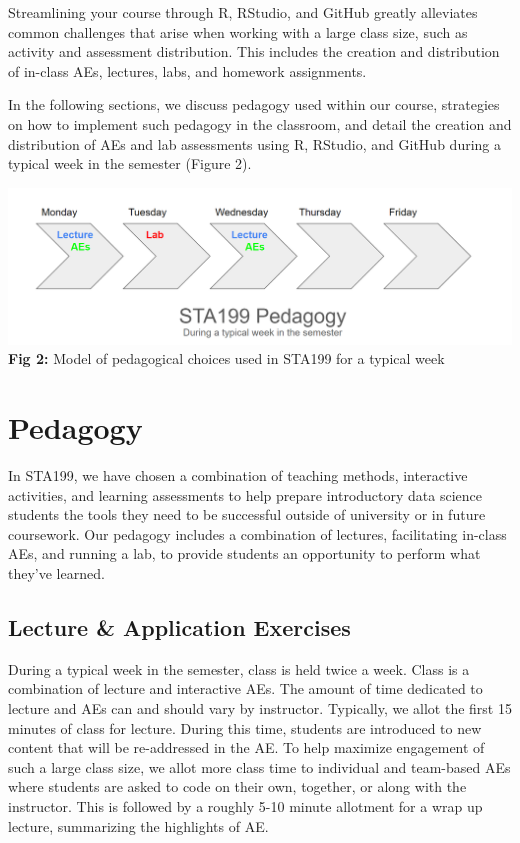 \documentclass[
  12pt]{article}
\begin{document}
Streamlining your course through R, RStudio, and GitHub greatly
alleviates common challenges that arise when working with a large class
size, such as activity and assessment distribution. This includes the
creation and distribution of in-class AEs, lectures, labs, and homework
assignments.

In the following sections, we discuss pedagogy used within our course,
strategies on how to implement such pedagogy in the classroom, and
detail the creation and distribution of AEs and lab assessments using R,
RStudio, and GitHub during a typical week in the semester (Figure 2).

\includegraphics{images/pedagogy.png} \textbf{Fig 2:} Model of
pedagogical choices used in STA199 for a typical week

\hypertarget{sec-ped}{%
\section{Pedagogy}\label{sec-ped}}

In STA199, we have chosen a combination of teaching methods, interactive
activities, and learning assessments to help prepare introductory data
science students the tools they need to be successful outside of
university or in future coursework. Our pedagogy includes a combination
of lectures, facilitating in-class AEs, and running a lab, to provide
students an opportunity to perform what they've learned.

\hypertarget{lecture-application-exercises}{%
\subsection{Lecture \& Application
Exercises}\label{lecture-application-exercises}}

During a typical week in the semester, class is held twice a week. Class
is a combination of lecture and interactive AEs. The amount of time
dedicated to lecture and AEs can and should vary by instructor.
Typically, we allot the first 15 minutes of class for lecture. During
this time, students are introduced to new content that will be
re-addressed in the AE. To help maximize engagement of such a large
class size, we allot more class time to individual and team-based AEs
where students are asked to code on their own, together, or along with
the instructor. This is followed by a roughly 5-10 minute allotment for
a wrap up lecture, summarizing the highlights of AE.
\end{document}
